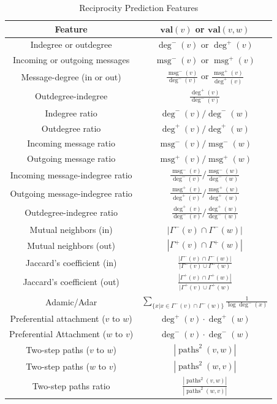 \documentclass[conference]{IEEEtran}
\begin{document}
\begin{table}[!t]
\renewcommand{\arraystretch}{1.3}
\caption{Reciprocity Prediction Features}
\label{table_recmethods}
\centering
\begin{tabular}{|c||c|}
\hline
\bf{Feature} & $\mathbf{val}(v)$ or $\mathbf{val}(v,w)$\\
\hline
Indegree or outdegree & $\deg^-(v)$ or $\deg^+(v)$ \\
Incoming or outgoing messages & $\operatorname{msg}^-(v)$ or $\operatorname{msg}^+(v)$ \\
Message-degree (in or out) & $\frac{\operatorname{msg}^-(v)}{\deg^-(v)}$ or $\frac{\operatorname{msg}^+(v)}{\deg^+(v)}$ \\
Outdegree-indegree & $\frac{\deg^+(v)}{\deg^-(v)}$ \\
\hline
\hline
Indegree ratio & $\deg^-(v) / \deg^-(w)$ \\
Outdegree ratio & $\deg^+(v) / \deg^+(w)$ \\
\hline
Incoming message ratio & $\operatorname{msg}^-(v) / \operatorname{msg}^-(w)$ \\
Outgoing message ratio & $\operatorname{msg}^+(v) / \operatorname{msg}^+(w)$ \\
\hline
Incoming message-indegree ratio & $\frac{\operatorname{msg}^-(v)}{\deg^-(v)} / \frac{\operatorname{msg}^-(w)}{\deg^-(w)}$ \\
Outgoing message-indegree ratio & $\frac{\operatorname{msg}^+(v)}{\deg^+(v)} / \frac{\operatorname{msg}^+(w)}{\deg^+(w)}$ \\
\hline
Outdegree-indegree ratio & $\frac{\deg^+(v)}{\deg^-(v)} / \frac{\deg^+(w)}{\deg^-(w)} $ \\
\hline
\hline
Mutual neighbors (in) & $|\Gamma^-(v) \cap \Gamma^-(w)|$ \\
Mutual neighbors (out) & $|\Gamma^+(v) \cap \Gamma^+(w)|$ \\
\hline
Jaccard's coefficient (in) & $\frac{|\Gamma^-(v) \cap \Gamma^-(w)|}{|\Gamma^-(v) \cup \Gamma^-(w)}$ \\
Jaccard's coefficient (out) & $\frac{|\Gamma^+(v) \cap \Gamma^+(w)|}{|\Gamma^+(v) \cup \Gamma^+(w)}$ \\
\hline
Adamic/Adar & $\sum_{\{x|x \in \Gamma^-(v) \cap \Gamma^-(w)\}} \frac{1}{\log{\deg^-(x)}}$ \\
\hline
Preferential attachment ($v$ to $w$) & $\deg^+(v)\cdot \deg^+(w)$ \\
Preferential Attachment ($w$ to $v$) & $\deg^-(v)\cdot \deg^-(w)$ \\
\hline
Two-step paths ($v$ to $w$) & $ |\operatorname{paths}^2(v,w)|$ \\
Two-step paths ($w$ to $v$) & $ |\operatorname{paths}^2(w,v)|$ \\
\hline
Two-step paths ratio & $\frac{|\operatorname{paths}^2(v,w)|}{|\operatorname{paths}^2(w,v)|}$ \\
\hline
\end{tabular}
\end{table}
\end{document}
